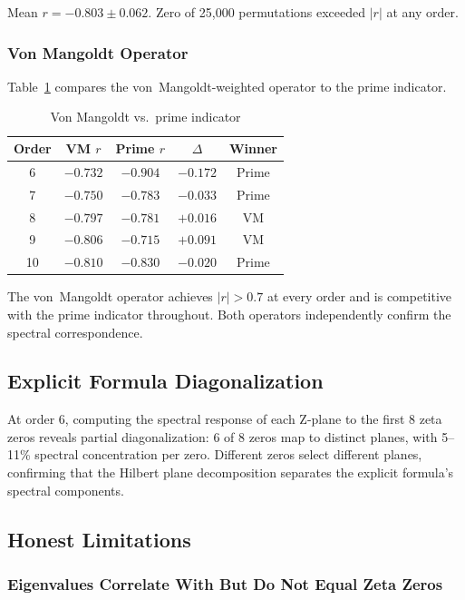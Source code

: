 \documentclass[11pt,a4paper]{article}
\begin{document}
Mean $r = -0.803 \pm 0.062$.  Zero of 25,000 permutations exceeded
$|r|$ at any order.

\subsubsection{Von Mangoldt Operator}

Table~\ref{tab:ev_vm} compares the von~Mangoldt-weighted operator to
the prime indicator.

\begin{table}[h]
\centering
\caption{Von Mangoldt vs.\ prime indicator}
\label{tab:ev_vm}
\begin{tabular}{ccccc}
\toprule
Order & VM $r$ & Prime $r$ & $\Delta$ & Winner \\
\midrule
6  & $-0.732$ & $-0.904$ & $-0.172$ & Prime \\
7  & $-0.750$ & $-0.783$ & $-0.033$ & Prime \\
8  & $-0.797$ & $-0.781$ & $+0.016$ & VM \\
9  & $-0.806$ & $-0.715$ & $+0.091$ & VM \\
10 & $-0.810$ & $-0.830$ & $-0.020$ & Prime \\
\bottomrule
\end{tabular}
\end{table}

The von~Mangoldt operator achieves $|r| > 0.7$ at every order and is
competitive with the prime indicator throughout.  Both operators
independently confirm the spectral correspondence.

\subsection{Explicit Formula Diagonalization}

At order 6, computing the spectral response of each Z-plane to the
first 8 zeta zeros reveals partial diagonalization: 6 of 8 zeros map
to distinct planes, with 5--11\% spectral concentration per zero.
Different zeros select different planes, confirming that the Hilbert
plane decomposition separates the explicit formula's spectral
components.

\subsection{Honest Limitations}

\subsubsection{Eigenvalues Correlate With But Do Not Equal Zeta Zeros}
\end{document}
